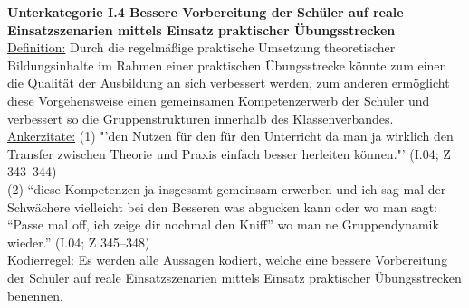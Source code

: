 \textbf{Unterkategorie I.4 Bessere Vorbereitung der Schüler auf reale Einsatzszenarien mittels Einsatz praktischer Übungsstrecken}\\
\underline{Definition:} Durch die regelmäßige praktische Umsetzung theoretischer Bildungsinhalte im Rahmen einer praktischen Übungsstrecke könnte zum einen die Qualität der Ausbildung an sich verbessert werden, zum anderen ermöglicht diese Vorgehensweise einen gemeinsamen Kompetenzerwerb der Schüler und verbessert so die Gruppenstrukturen innerhalb des Klassenverbandes.\\
\underline{Ankerzitate:} (1) "'den Nutzen für den für den Unterricht da man ja wirklich den Transfer zwischen Theorie und Praxis einfach besser herleiten können."' (I.04; Z 343--344)\\ (2) "`diese Kompetenzen ja insgesamt gemeinsam erwerben und ich sag mal der Schwächere vielleicht bei den Besseren was abgucken kann oder wo man sagt: "`Passe mal off, ich zeige dir nochmal den Kniff"' wo man ne Gruppendynamik wieder."' (I.04; Z 345--348)\\
\underline{Kodierregel:} Es werden alle Aussagen kodiert, welche eine bessere Vorbereitung der Schüler auf reale Einsatzszenarien mittels Einsatz praktischer Übungsstrecken benennen.
